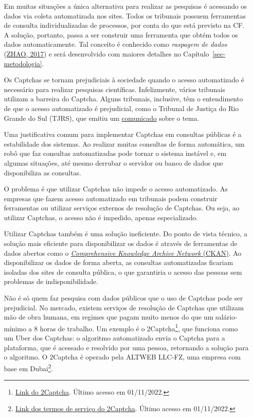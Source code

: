 \documentclass[12pt,twoside,brazilian]{book}
\begin{document}
Em muitas situações a única alternativa para realizar as pesquisas é
acessando os dados via coleta automatizada nos sites. Todos os tribunais
possuem ferramentas de consulta individualizadas de processos, por conta
do que está previsto na CF. A solução, portanto, passa a ser construir
uma ferramenta que obtém todos os dados automaticamente. Tal conceito é
conhecido como \emph{raspagem de dados}
(\protect\hyperlink{ref-zhao2017}{ZHAO, 2017}) e será desenvolvido com
maiores detalhes no Capítulo~\ref{sec-metodologia}.

Os Captchas se tornam prejudiciais à sociedade quando o acesso
automatizado é necessário para realizar pesquisas científicas.
Infelizmente, vários tribunais utilizam a barreira do Captcha. Alguns
tribunais, inclusive, têm o entendimento de que o acesso automatizado é
prejudicial, como o Tribunal de Justiça do Rio Grande do Sul (TJRS), que
emitiu um
\href{https://www.tjrs.jus.br/novo/processos-e-servicos/processo-eletronico/acesso-robotizado-a-dados-publicos-e-duplamente-arriscado/}{comunicado}
sobre o tema.

Uma justificativa comum para implementar Captchas em consultas públicas
é a estabilidade dos sistemas. Ao realizar muitas consultas de forma
automática, um robô que faz consultas automatizadas pode tornar o
sistema instável e, em algumas situações, até mesmo derrubar o servidor
ou banco de dados que disponibiliza as consultas.

O problema é que utilizar Captchas não impede o acesso automatizado. As
empresas que fazem acesso automatizado em tribunais podem construir
ferramentas ou utilizar serviços externos de resolução de Captchas. Ou
seja, ao utilizar Captchas, o acesso não é impedido, apenas
especializado.

Utilizar Captchas também é uma solução ineficiente. Do ponto de vista
técnico, a solução mais eficiente para disponibilizar os dados é através
de ferramentas de dados abertos como o
\href{https://ckan.org/}{\emph{Comprehensive Knowledge Archive Network}
(CKAN)}. Ao disponibilizar os dados de forma aberta, as consultas
automatizadas ficariam isoladas dos sites de consulta pública, o que
garantiria o acesso das pessoas sem problemas de indisponibilidade.

Não é só quem faz pesquisa com dados públicos que o uso de Captchas pode
ser prejudicial. No mercado, existem serviços de resolução de Captchas
que utilizam mão de obra humana, em regimes que pagam muito menos do que
um salário-mínimo a 8 horas de trabalho. Um exemplo é o
2Captcha\footnote{\href{https://2captcha.com/make-money-online}{Link do
  2Captcha}. Último acesso em 01/11/2022.}, que funciona como um Uber
dos Captchas: o algoritmo automatizado envia o Captcha para a
plataforma, que é acessado e resolvido por uma pessoa, retornando a
solução para o algoritmo. O 2Captcha é operado pela ALTWEB LLC-FZ, uma
empresa com base em Dubai\footnote{\href{https://2captcha.com/terms-of-service}{Link
  dos termos de serviço do 2Captcha}. Último acesso em 01/11/2022.}.
\end{document}
